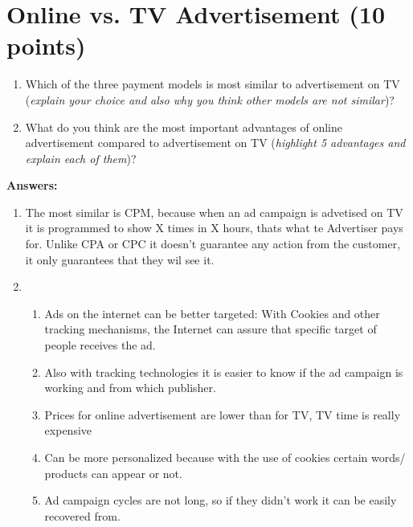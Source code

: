 \documentclass{WeSTassignment}
\begin{document}

\section{Online vs. TV Advertisement (10 points)}

\begin{enumerate}
\item Which of the three payment models is most similar to advertisement on TV (\textit{explain your choice and also why you think other models are not similar})? 
\item What do you think are the most important advantages of online advertisement
compared   to   advertisement  on  TV  (\textit{highlight 5 advantages and explain each of them})? 
\end{enumerate} 

\textbf{Answers:}
\begin{enumerate}
\item The most similar is CPM, because when an ad campaign is advetised on TV it is programmed to show X times in X hours, thats what te Advertiser pays for. Unlike CPA or CPC it doesn't guarantee any action from the customer, it only guarantees that they wil see it.

\item 
\begin{enumerate}
\item Ads on the internet can be better targeted: With Cookies and other tracking mechanisms, the Internet can assure that specific target of people receives the ad.
\item Also with tracking technologies it is easier to know if the ad campaign is working and from which publisher.
\item Prices for online advertisement are lower than for TV, TV time is really expensive
\item Can be more personalized because with the use of cookies certain words/ products can appear or not.
\item Ad campaign cycles are not long, so if they didn't work it can be easily recovered from.
\end{enumerate}
\end{enumerate}







\makefooter
\end{document}
